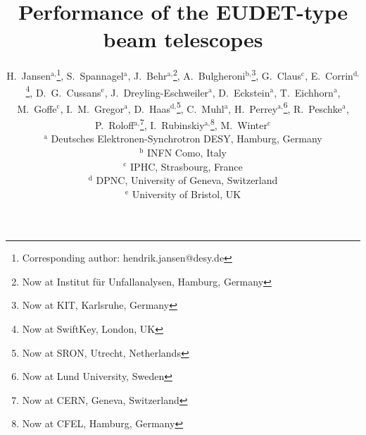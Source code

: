 \documentclass[a4paper,10pt]{article}
\makeatletter
\renewcommand{\maketitle}{\bgroup\setlength{\parindent}{0pt}
\begin{flushleft}
  \vspace*{10mm}
  \textbf{\huge\sffamily\@title}
  \vspace{5mm}
   
  \large \@author
\end{flushleft}\egroup
}
\makeatother
\begin{document}
\linenumbers








\title{Performance of the EUDET-type\\ beam telescopes}
\author{
H.~Jansen${}^{\textrm{a,}}$\footnote[*]{Corresponding author: hendrik.jansen@desy.de},
S.~Spannagel${}^{\textrm{a}}$, 
J.~Behr${}^{\textrm{a,}}$\footnote{Now at Institut f\"ur Unfallanalysen, Hamburg, Germany},
A.~Bulgheroni${}^{\textrm{b,}}$\footnote{Now at KIT, Karlsruhe, Germany},
G.~Claus${}^{\textrm{c}}$,
E.~Corrin${}^{\textrm{d,}}$\footnote{Now at SwiftKey, London, UK},
D.~G.~Cussans${}^{\textrm{e}}$,
J.~Dreyling-Eschweiler${}^{\textrm{a}}$, 
D.~Eckstein${}^{\textrm{a}}$, 
T.~Eichhorn${}^{\textrm{a}}$, 
M.~Goffe${}^{\textrm{c}}$,
I.~M.~Gregor${}^{\textrm{a}}$, 
D.~Haas${}^{\textrm{d,}}$\footnote{Now at SRON, Utrecht, Netherlands},
C.~Muhl${}^{\textrm{a}}$,
H.~Perrey${}^{\textrm{a,}}$\footnote{Now at Lund University, Sweden}, 
R.~Peschke${}^{\textrm{a}}$, 
P.~Roloff${}^{\textrm{a,}}$\footnote{Now at CERN, Geneva, Switzerland}, 
I.~Rubinskiy${}^{\textrm{a,}}$\footnote{Now at CFEL, Hamburg, Germany}, 
M.~Winter${}^{\textrm{c}}$\\
\vspace{3mm}
${}^{\textrm{a}}$ Deutsches Elektronen-Synchrotron DESY, Hamburg, Germany\\
${}^{\textrm{b}}$ INFN Como, Italy\\
${}^{\textrm{c}}$ IPHC, Strasbourg, France\\
${}^{\textrm{d}}$ DPNC, University of Geneva, Switzerland\\
${}^{\textrm{e}}$ University of Bristol, UK
}
\maketitle
\end{document}
